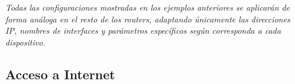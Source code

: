 \begin{tcolorbox}[colback=gray!10!white, colframe=gray!70!black, title=NOTA:, size=title]
	\textit{Todas las configuraciones mostradas en los ejemplos anteriores se aplicarán de forma análoga en el resto de los routers, adaptando únicamente las direcciones IP, nombres de interfaces y parámetros específicos según corresponda a cada dispositivo.}
\end{tcolorbox}

\subsection{Acceso a Internet}






